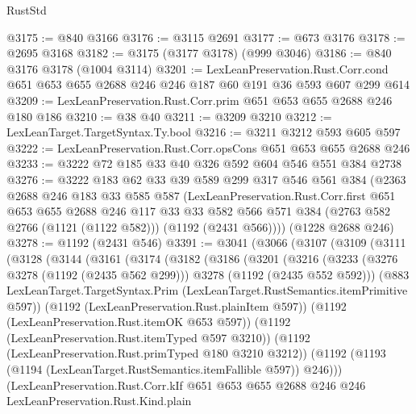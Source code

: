 \begin{lexlean}{RustStd}
\begin{coremodule}
{\begin{coremodule}
{{{{{{{{{{@3175 := @840 @3166
@3176 := @3115 @2691
@3177 := @673 @3176
@3178 := @2695 @3168
@3182 := @3175 (@3177 @3178) (@999 @3046)
@3186 := @840 @3176 @3178 (@1004 @3114)
@3201 := LexLeanPreservation.Rust.Corr.cond
    @651
    @653
    @655
    @2688
    @246
    @246
    @187
    @60
    @191
    @36
    @593
    @607
    @299
    @614
@3209 := LexLeanPreservation.Rust.Corr.prim @651 @653 @655 @2688 @246 @180 @186
@3210 := @38 @40
@3211 := @3209 @3210
@3212 := LexLeanTarget.TargetSyntax.Ty.bool
@3216 := @3211 @3212 @593 @605 @597
@3222 := LexLeanPreservation.Rust.Corr.opsCons @651 @653 @655 @2688 @246
@3233 := @3222 @72 @185 @33 @40 @326 @592 @604 @546 @551 @384 @2738
@3276 := @3222
    @183
    @62
    @33
    @39
    @589
    @299
    @317
    @546
    @561
    @384
    (@2363
      @2688
      @246
      @183
      @33
      @585
      @587
      (LexLeanPreservation.Rust.Corr.first
        @651
        @653
        @655
        @2688
        @246
        @117
        @33
        @33
        @582
        @566
        @571
        @384
        (@2763 @582 @2766 (@1121 (@1122 @582)))
        (@1192 (@2431 @566))))
    (@1228 @2688 @246)
@3278 := @1192 (@2431 @546)
@3391 := @3041
    (@3066
      (@3107
        (@3109
          (@3111
            (@3128
              (@3144
                (@3161
                  (@3174
                    (@3182
                      (@3186
                        (@3201
                          (@3216
                            (@3233
                              (@3276 @3278 (@1192 (@2435 @562 @299)))
                              @3278
                              (@1192 (@2435 @552 @592)))
                            (@883
                              LexLeanTarget.TargetSyntax.Prim
                              (LexLeanTarget.RustSemantics.itemPrimitive @597))
                            (@1192 (LexLeanPreservation.Rust.plainItem @597))
                            (@1192 (LexLeanPreservation.Rust.itemOK @653 @597))
                            (@1192 (LexLeanPreservation.Rust.itemTyped @597 @3210))
                            (@1192 (LexLeanPreservation.Rust.primTyped @180 @3210 @3212))
                            (@1192
                              (@1193 (@1194 (LexLeanTarget.RustSemantics.itemFallible @597)) @246)))
                          (LexLeanPreservation.Rust.Corr.kIf
                            @651
                            @653
                            @655
                            @2688
                            @246
                            @246
                            LexLeanPreservation.Rust.Kind.plain
}}}}}}}}}}
\end{coremodule}}
\end{coremodule}
\end{lexlean}
